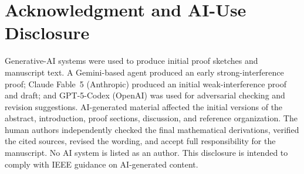 \documentclass[12pt,draftclsnofoot,onecolumn,conference]{IEEEtran}
\begin{document}
\section*{Acknowledgment and AI-Use Disclosure}

Generative-AI systems were used to produce initial proof sketches and
manuscript text. A Gemini-based agent produced an early strong-interference
proof; Claude Fable~5 (Anthropic) produced an initial weak-interference
proof and draft; and GPT-5-Codex (OpenAI) was used for adversarial checking
and revision suggestions. AI-generated material affected the initial
versions of the abstract, introduction, proof sections, discussion, and
reference organization. The human authors independently checked the final
mathematical derivations, verified the cited sources, revised the wording,
and accept full responsibility for the manuscript. No AI system is listed
as an author. This disclosure is intended to comply with IEEE guidance on
AI-generated content.
\end{document}
